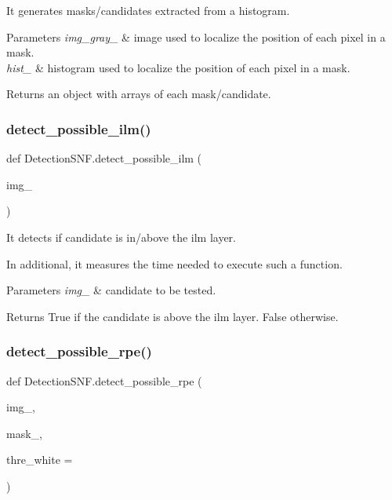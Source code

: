 It generates masks/candidates extracted from a histogram. 


\begin{DoxyParams}{Parameters}
{\em img\+\_\+gray\+\_\+} & image used to localize the position of each pixel in a mask. \\
\hline
{\em hist\+\_\+} & histogram used to localize the position of each pixel in a mask. \\
\hline
\end{DoxyParams}
\begin{DoxyReturn}{Returns}
an object with arrays of each mask/candidate. 
\end{DoxyReturn}
\mbox{\label{namespaceDetectionSNF_ad77677096bdfa2efd74b387c0b3ec972}} 
\subsubsection{\texorpdfstring{detect\+\_\+possible\+\_\+ilm()}{detect\_possible\_ilm()}}
{\footnotesize\ttfamily def Detection\+S\+N\+F.\+detect\+\_\+possible\+\_\+ilm (\begin{DoxyParamCaption}\item[{}]{img\+\_\+ }\end{DoxyParamCaption})}



It detects if candidate is in/above the ilm layer. 

In additional, it measures the time needed to execute such a function. 
\begin{DoxyParams}{Parameters}
{\em img\+\_\+} & candidate to be tested. \\
\hline
\end{DoxyParams}
\begin{DoxyReturn}{Returns}
True if the candidate is above the ilm layer. False otherwise. 
\end{DoxyReturn}
\mbox{\label{namespaceDetectionSNF_accb9b9b46aacfb8f4303f291eb307d47}} 
\subsubsection{\texorpdfstring{detect\+\_\+possible\+\_\+rpe()}{detect\_possible\_rpe()}}
{\footnotesize\ttfamily def Detection\+S\+N\+F.\+detect\+\_\+possible\+\_\+rpe (\begin{DoxyParamCaption}\item[{}]{img\+\_\+,  }\item[{}]{mask\+\_\+,  }\item[{}]{thre\+\_\+white = {} }\end{DoxyParamCaption})}




